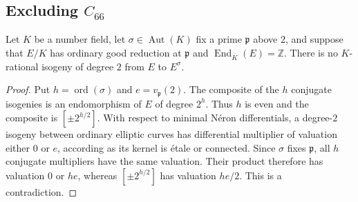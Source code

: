 \subsection{Excluding $C_{66}$}
\begin{lemma}\label{lem:decic-local-two-cycle}
Let $K$ be a number field, let $\sigma\in\operatorname{Aut}(K)$ fix a
prime $\mathfrak p$ above $2$, and suppose that $E/K$ has ordinary good
reduction at $\mathfrak p$ and $\operatorname{End}_{\overline K}(E)=\mathbb Z$.
There is no $K$-rational isogeny of degree $2$ from $E$ to $E^\sigma$.
\end{lemma}
\begin{proof}
Put $h=\operatorname{ord}(\sigma)$ and $e=v_{\mathfrak p}(2)$.
The composite of the $h$ conjugate isogenies is an endomorphism of $E$
of degree $2^h$. Thus $h$ is even and the composite is
$[\pm2^{h/2}]$. With respect to minimal N\'eron differentials, a degree-$2$
isogeny between ordinary elliptic curves has differential multiplier
of valuation either $0$ or $e$, according as its kernel is \'etale or
connected. Since $\sigma$ fixes $\mathfrak p$, all $h$ conjugate
multipliers have the same valuation. Their product therefore has
valuation $0$ or $he$, whereas $[\pm2^{h/2}]$ has valuation $he/2$.
This is a contradiction.
\end{proof}

